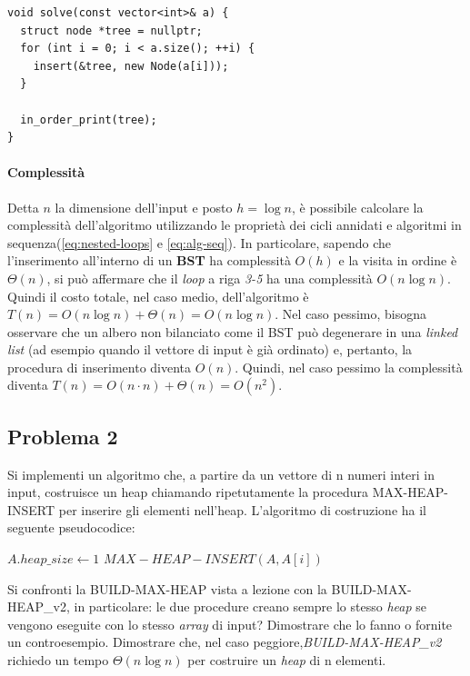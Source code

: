 \documentclass{article}
\begin{document}
\begin{lstlisting}[caption={Ordinamento di un albero mediante insert},captionpos=b]
void solve(const vector<int>& a) {
  struct node *tree = nullptr;
  for (int i = 0; i < a.size(); ++i) {
    insert(&tree, new Node(a[i]));
  }

  in_order_print(tree);
}

\end{lstlisting}

\paragraph{Complessità}
Detta $n$ la dimensione dell'input e posto $h = \log n$, è possibile calcolare la complessità dell'algoritmo utilizzando le proprietà dei cicli annidati e algoritmi in sequenza(\cref{eq:nested-loops} e \cref{eq:alg-seq}). In particolare, sapendo che l'inserimento all'interno di un \textbf{BST} ha complessità $O(h)$ e la visita in ordine è $\Theta(n)$, si può affermare che il \textit{loop} a riga \textit{3-5} ha una complessità $O(n\log n)$. Quindi il costo totale, nel caso medio, dell'algoritmo è $T(n) = O(n\log n) + \Theta(n) = O(n \log n)$. Nel caso pessimo, bisogna osservare che un albero non bilanciato come il BST può degenerare in una \textit{linked list} (ad esempio quando il vettore di input è già ordinato) e, pertanto, la procedura di inserimento diventa $O(n)$. Quindi, nel caso pessimo la complessità diventa $T(n) = O(n \cdot n) + \Theta(n) = O(n^2)$.
\clearpage

\subsection{Problema 2}
Si implementi un algoritmo che, a partire da un vettore di n numeri interi in input, costruisce un heap chiamando ripetutamente la procedura MAX-HEAP-INSERT per inserire gli elementi nell’heap. L’algoritmo di costruzione ha il seguente
pseudocodice:

\begin{algorithm}
    \begin{algorithmic}
            \State $A.heap\_size \gets 1$
                \State $MAX-HEAP-INSERT(A, A[i])$
            \EndFor
        \EndProcedure
    \end{algorithmic}
\end{algorithm}

Si confronti la BUILD-MAX-HEAP vista a lezione con la BUILD-MAX-HEAP\_v2, in
particolare: le due procedure creano sempre lo stesso \textit{heap} se vengono eseguite con lo stesso \textit{array} di input? Dimostrare che lo fanno o fornite un controesempio.
Dimostrare che, nel caso peggiore,\textit{BUILD-MAX-HEAP\_v2} richiedo un tempo $\Theta(n\log n)$ per costruire un \textit{heap} di n elementi.
\end{document}
